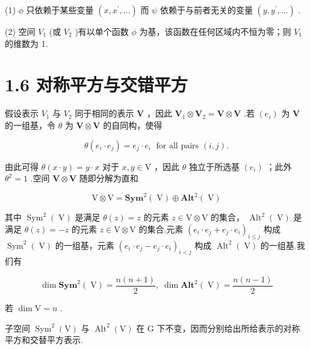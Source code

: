 (1) \(\phi\) 只依赖于某些变量 \(\left( {x,{x}^{\prime },\ldots }\right)\) 而 \(\psi\) 依赖于与前者无关的变量 \(\left( {y,{y}^{\prime },\ldots }\right)\) .

(2) 空间 \({V}_{1}\) (或 \({V}_{2}\) )有以单个函数 \(\phi\) 为基，该函数在任何区域内不恒为零；则 \({V}_{1}\) 的维数为 1.

\section*{1.6 对称平方与交错平方}

假设表示 \({V}_{1}\) 与 \({V}_{2}\) 同于相同的表示 \(\mathbf{V}\) ，因此 \({\mathbf{V}}_{1} \otimes  {\mathbf{V}}_{2} = \mathbf{V} \otimes  \mathbf{V}\) .若 \(\left( {e}_{i}\right)\) 为 \(\mathbf{V}\) 的一组基，令 \(\theta\) 为 \(\mathbf{V} \otimes  \mathbf{V}\) 的自同构，使得

\[
\theta \left( {{e}_{i} \cdot  {e}_{j}}\right)  = {e}_{j} \cdot  {e}_{i}\;\text{ for all pairs }\left( {i,j}\right) .
\]

由此可得 \(\theta \left( {x \cdot  y}\right)  = y \cdot  x\) 对于 \(x,y \in  \mathrm{V}\) ，因此 \(\theta\) 独立于所选基 \(\left( {e}_{i}\right)\) ；此外 \({\theta }^{2} = 1\) .空间 \(\mathbf{V} \otimes  \mathbf{V}\) 随即分解为直和

\[
\mathrm{V} \otimes  \mathrm{V} = {\mathbf{{Sym}}}^{2}\left( \mathrm{\;V}\right)  \oplus  {\mathbf{{Alt}}}^{2}\left( \mathrm{\;V}\right)
\]

其中 \({\operatorname{Sym}}^{2}\left( \mathrm{\;V}\right)\) 是满足 \(\theta \left( z\right)  = z\) 的元素 \(z \in  \mathrm{V} \otimes  \mathrm{V}\) 的集合， \({\operatorname{Alt}}^{2}\left( \mathrm{\;V}\right)\) 是满足 \(\theta \left( z\right)  =  - z\) 的元素 \(z \in  \mathrm{V} \otimes  \mathrm{V}\) 的集合.元素 \({\left( {e}_{i} \cdot  {e}_{j} + {e}_{j} \cdot  {e}_{i}\right) }_{i \leq  j}\) 构成 \({\operatorname{Sym}}^{2}\left( \mathrm{\;V}\right)\) 的一组基，元素 \({\left( {e}_{i} \cdot  {e}_{j} - {e}_{j} \cdot  {e}_{i}\right) }_{i < j}\) 构成 \({\operatorname{Alt}}^{2}\left( \mathrm{\;V}\right)\) 的一组基.我们有

\[
\dim {\mathbf{{Sym}}}^{2}\left( \mathrm{\;V}\right)  = \frac{n\left( {n + 1}\right) }{2},\;\dim {\mathbf{{Alt}}}^{2}\left( \mathrm{\;V}\right)  = \frac{n\left( {n - 1}\right) }{2}
\]

若 \(\dim \mathrm{V} = n\) .

子空间 \({\operatorname{Sym}}^{2}\left( \mathrm{V}\right)\) 与 \({\operatorname{Alt}}^{2}\left( \mathrm{V}\right)\) 在 \(\mathrm{G}\) 下不变，因而分别给出所给表示的对称平方和交替平方表示.
